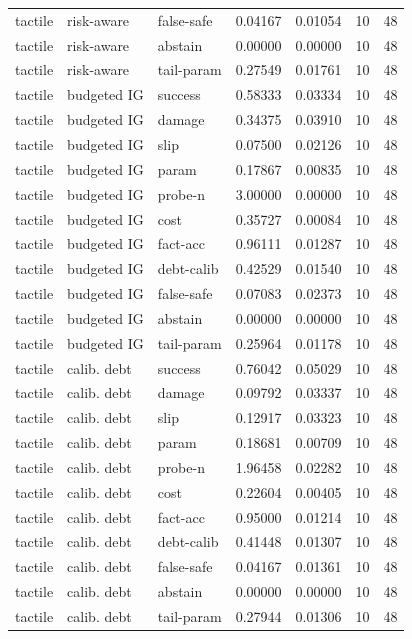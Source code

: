 \documentclass{article}
\begin{document}
\begin{center}
\begin{longtable}{lllllll}
tactile & risk-aware & false-safe & 0.04167 & 0.01054 & 10 & 48 \\
tactile & risk-aware & abstain & 0.00000 & 0.00000 & 10 & 48 \\
tactile & risk-aware & tail-param & 0.27549 & 0.01761 & 10 & 48 \\
tactile & budgeted IG & success & 0.58333 & 0.03334 & 10 & 48 \\
tactile & budgeted IG & damage & 0.34375 & 0.03910 & 10 & 48 \\
tactile & budgeted IG & slip & 0.07500 & 0.02126 & 10 & 48 \\
tactile & budgeted IG & param & 0.17867 & 0.00835 & 10 & 48 \\
tactile & budgeted IG & probe-n & 3.00000 & 0.00000 & 10 & 48 \\
tactile & budgeted IG & cost & 0.35727 & 0.00084 & 10 & 48 \\
tactile & budgeted IG & fact-acc & 0.96111 & 0.01287 & 10 & 48 \\
tactile & budgeted IG & debt-calib & 0.42529 & 0.01540 & 10 & 48 \\
tactile & budgeted IG & false-safe & 0.07083 & 0.02373 & 10 & 48 \\
tactile & budgeted IG & abstain & 0.00000 & 0.00000 & 10 & 48 \\
tactile & budgeted IG & tail-param & 0.25964 & 0.01178 & 10 & 48 \\
tactile & calib. debt & success & 0.76042 & 0.05029 & 10 & 48 \\
tactile & calib. debt & damage & 0.09792 & 0.03337 & 10 & 48 \\
tactile & calib. debt & slip & 0.12917 & 0.03323 & 10 & 48 \\
tactile & calib. debt & param & 0.18681 & 0.00709 & 10 & 48 \\
tactile & calib. debt & probe-n & 1.96458 & 0.02282 & 10 & 48 \\
tactile & calib. debt & cost & 0.22604 & 0.00405 & 10 & 48 \\
tactile & calib. debt & fact-acc & 0.95000 & 0.01214 & 10 & 48 \\
tactile & calib. debt & debt-calib & 0.41448 & 0.01307 & 10 & 48 \\
tactile & calib. debt & false-safe & 0.04167 & 0.01361 & 10 & 48 \\
tactile & calib. debt & abstain & 0.00000 & 0.00000 & 10 & 48 \\
tactile & calib. debt & tail-param & 0.27944 & 0.01306 & 10 & 48 \\
\bottomrule
\end{longtable}
\renewcommand{\arraystretch}{1.0}
\end{center}
\end{document}
